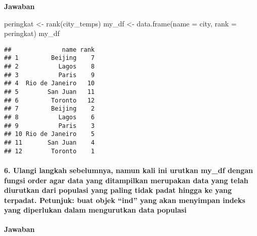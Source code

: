 \documentclass[
]{article}
\newenvironment{Shaded}{\begin{snugshade}}{\end{snugshade}}
\newcommand{\AttributeTok}[1]{\textcolor[rgb]{0.77,0.63,0.00}{#1}}
\newcommand{\FunctionTok}[1]{\textcolor[rgb]{0.00,0.00,0.00}{#1}}
\newcommand{\NormalTok}[1]{#1}
\newcommand{\OtherTok}[1]{\textcolor[rgb]{0.56,0.35,0.01}{#1}}
\newcommand{\SpecialCharTok}[1]{\textcolor[rgb]{0.00,0.00,0.00}{#1}}
\begin{document}
\textbf{Jawaban}

\begin{Shaded}
\begin{Highlighting}[]
\NormalTok{peringkat }\OtherTok{\textless{}{-}} \FunctionTok{rank}\NormalTok{(city\_temps)}
\NormalTok{my\_df }\OtherTok{\textless{}{-}} \FunctionTok{data.frame}\NormalTok{(}\AttributeTok{name =}\NormalTok{ city, }\AttributeTok{rank =}\NormalTok{ peringkat)}
\NormalTok{my\_df}
\end{Highlighting}
\end{Shaded}

\begin{verbatim}
##              name rank
## 1         Beijing    7
## 2           Lagos    8
## 3           Paris    9
## 4  Rio de Janeiro   10
## 5        San Juan   11
## 6         Toronto   12
## 7         Beijing    2
## 8           Lagos    6
## 9           Paris    3
## 10 Rio de Janeiro    5
## 11       San Juan    4
## 12        Toronto    1
\end{verbatim}

\hypertarget{ulangi-langkah-sebelumnya-namun-kali-ini-urutkan-my_df-dengan-fungsi-order-agar-data-yang-ditampilkan-merupakan-data-yang-telah-diurutkan-dari-populasi-yang-paling-tidak-padat-hingga-ke-yang-terpadat.-petunjuk-buat-objek-ind-yang-akan-menyimpan-indeks-yang-diperlukan-dalam-mengurutkan-data-populasi}{%
\paragraph{6. Ulangi langkah sebelumnya, namun kali ini urutkan my\_df
dengan fungsi order agar data yang ditampilkan merupakan data yang telah
diurutkan dari populasi yang paling tidak padat hingga ke yang terpadat.
Petunjuk: buat objek ``ind'' yang akan menyimpan indeks yang diperlukan
dalam mengurutkan data
populasi}\label{ulangi-langkah-sebelumnya-namun-kali-ini-urutkan-my_df-dengan-fungsi-order-agar-data-yang-ditampilkan-merupakan-data-yang-telah-diurutkan-dari-populasi-yang-paling-tidak-padat-hingga-ke-yang-terpadat.-petunjuk-buat-objek-ind-yang-akan-menyimpan-indeks-yang-diperlukan-dalam-mengurutkan-data-populasi}}

\textbf{Jawaban}

\begin{Shaded}
\end{Shaded}
\end{document}
